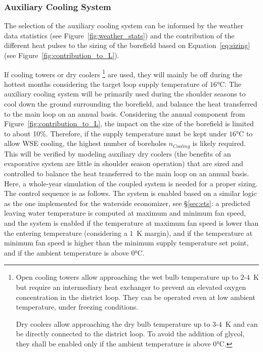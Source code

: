 \subsubsection{Auxiliary Cooling System} \label{sec:aux_cooling}

The selection of the auxiliary cooling system can be informed by the weather data statistics (see Figure~\ref{fig:weather_stats}) and the contribution of the different heat pulses to the sizing of the borefield based on Equation~\ref{eq:sizing} (see Figure~\ref{fig:contribution_to_L}).

If cooling towers or dry coolers%
\footnote{
Open cooling towers allow approaching the wet bulb temperature up to $2$-$4$~K but require an intermediary heat exchanger to prevent an elevated oxygen concentration in the district loop. They can be operated even at low ambient temperature, under freezing conditions.

Dry coolers allow approaching the dry bulb temperature up to $3$-$4$~K and can be directly connected to the district loop. To avoid the addition of glycol, they shall be enabled only if the ambient temperature is above $0$°C.
}
are used, they will mainly be off during the hottest months considering the target loop supply temperature of $16$°C.
The auxiliary cooling system will be primarily used during the shoulder seasons to cool down the ground surrounding the borefield, and balance the heat transferred to the main loop on an annual basis.
Considering the annual component from Figure~\ref{fig:contribution_to_L}, the impact on the size of the borefield is limited to about 10\%. Therefore, if the supply temperature must be kept under $16$°C to allow WSE cooling, the highest number of boreholes $n_{Cooling}$ is likely required. This will be verified by modeling auxiliary dry coolers (the benefits of an evaporative system are little in shoulder season operation) that are sized and controlled to balance the heat transferred to the main loop on an annual basis.
Here, a whole-year simulation of the coupled system is needed for a proper sizing. The control sequence is as follows.
The system is enabled based on a similar logic as the one implemented for the waterside economizer, see §\ref{sec:ets}: a predicted leaving water temperature is computed at maximum and minimum fan speed, and  the system is enabled if the temperature at maximum fan speed is lower than the entering temperature (considering a $1$~K margin), and if the temperature at minimum fan speed is higher than the minimum supply temperature set point, and if the ambient temperature is above $0$°C.
